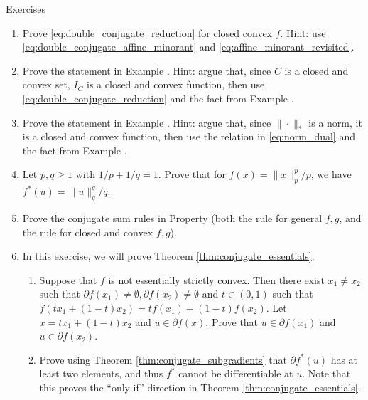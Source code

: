 \begin{xcb}{Exercises}
\begin{enumerate}[label=\thechapter.\arabic*]
\item \label{ex:double_conjugate_reduction} 
  Prove \eqref{eq:double_conjugate_reduction} for closed convex $f$. Hint: use
  \eqref{eq:double_conjugate_affine_minorant} and
  \eqref{eq:affine_minorant_revisited}.  

\item \label{ex:support_function_conjugate}
  Prove the statement in Example . Hint:
  argue that, since $C$ is a closed and convex set, $I_C$ is a closed and convex
  function, then use \eqref{eq:double_conjugate_reduction} and the fact from 
  Example . 

\item \label{ex:norm_conjugate}
  Prove the statement in Example . Hint: argue that,
  since $\|\cdot\|_*$ is a norm, it is a closed and convex function, then use
  the relation in \eqref{eq:norm_dual} and the fact from Example 
  .  
 
\item Let $p,q \geq 1$ with $1/p + 1/q = 1$. Prove that for $f(x) =
  \|x\|_p^p/p$, we have $f^*(u) = \|u\|_q^q/q$.   

\item Prove the conjugate sum rules in Property
   (both the rule for general $f,g$, and the
  rule for closed and convex $f,g$).  

\item \label{ex:conjugate_essentials} 
  In this exercise, we will prove Theorem \ref{thm:conjugate_essentials}.

\begin{enumerate}[label=\alph*.]
\item Suppose that $f$ is not essentially strictly convex. Then there exist
  $x_1 \not= x_2$ such that $\partial f(x_1) \not= \emptyset, \partial f(x_2)
  \not= \emptyset$ and $t \in (0,1)$ such that $f(tx_1 + (1-t)x_2) = tf(x_1) +
  (1-t)f(x_2)$. Let $x = tx_1 + (1-t)x_2$ and $u \in \partial f(x)$. Prove that
  $u \in \partial f(x_1)$ and $u \in \partial f(x_2)$.  

\item Prove using Theorem \ref{thm:conjugate_subgradients} that $\partial
  f^*(u)$ has at least two elements, and thus $f^*$ cannot be differentiable at
  $u$. Note that this proves the ``only if'' direction in Theorem
  \ref{thm:conjugate_essentials}.  


\end{enumerate}
\end{enumerate}
\end{xcb}
